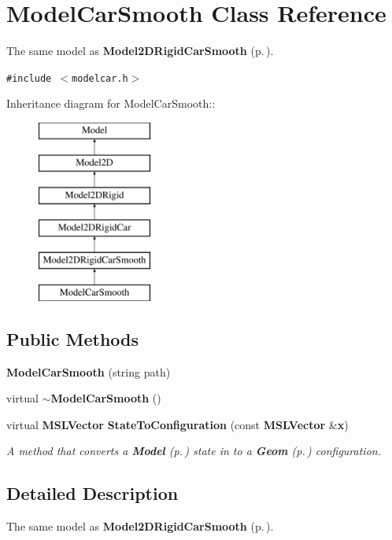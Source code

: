 \section{Model\-Car\-Smooth  Class Reference}
\label{classModelCarSmooth}
The same model as {\bf Model2DRigid\-Car\-Smooth} {\rm (p.\,\pageref{classModel2DRigidCarSmooth})}. 


{\tt \#include $<$modelcar.h$>$}

Inheritance diagram for Model\-Car\-Smooth::\begin{figure}[H]
\begin{center}
\leavevmode
\includegraphics[height=6cm]{classModelCarSmooth}
\end{center}
\end{figure}
\subsection*{Public Methods}
\begin{CompactItemize}
\item 
{\bf Model\-Car\-Smooth} (string path)
\item 
virtual {\bf $\sim$Model\-Car\-Smooth} ()
\item 
virtual {\bf MSLVector} {\bf State\-To\-Configuration} (const {\bf MSLVector} \&{\bf x})
\begin{CompactList}\small\item\em A method that converts a {\bf Model} {\rm (p.\,\pageref{classModel})} state in to a {\bf Geom} {\rm (p.\,\pageref{classGeom})} configuration.\item\end{CompactList}\end{CompactItemize}


\subsection{Detailed Description}
The same model as {\bf Model2DRigid\-Car\-Smooth} {\rm (p.\,\pageref{classModel2DRigidCarSmooth})}.



